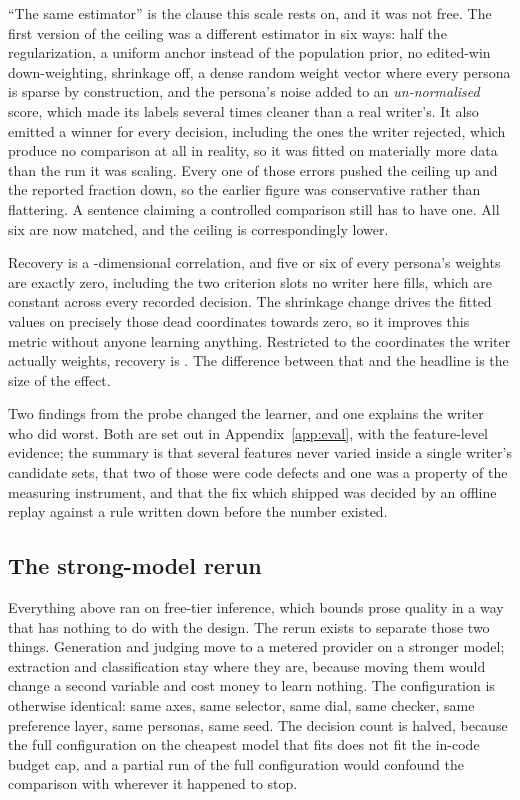 \documentclass{article}
\begin{document}
``The same estimator'' is the clause this scale rests on, and it was not free. The first version of the ceiling was a different estimator in six ways:
half the regularization, a uniform anchor instead of the population prior, no edited-win
down-weighting, shrinkage off, a dense random weight vector where every persona is sparse by
construction, and the persona's noise added to an \emph{un-normalised} score, which made its
labels several times cleaner than a real writer's. It also emitted a winner for every
decision, including the ones the writer rejected, which produce no comparison at all in
reality, so it was fitted on materially more data than the run it was scaling. Every one of
those errors pushed the ceiling up and the reported fraction down, so the earlier figure was
conservative rather than flattering. A sentence claiming a controlled comparison still
has to have one. All six are now matched, and the ceiling is correspondingly lower.

Recovery is a \rFeatures{}-dimensional correlation,
and five or six of every persona's \rFeatures{} weights are exactly zero, including the two
criterion slots no writer here fills, which are constant across every recorded decision. The
shrinkage change drives the fitted values on precisely those dead coordinates towards zero, so
it improves this metric without anyone learning anything. Restricted to the coordinates the
writer actually weights, recovery is \rLiveWeightRecoveryIdentified{}. The difference between that and the headline is the size of the effect.

Two findings from the probe changed the learner, and one explains the writer who did worst. Both are set out in Appendix~\ref{app:eval}, with the
feature-level evidence; the summary is that several features never varied inside a single
writer's candidate sets, that two of those were code defects and one was a property of the
measuring instrument, and that the fix which shipped was decided by an offline replay
against a rule written down before the number existed.

\subsection{The strong-model rerun}
\label{sec:metered}

Everything above ran on free-tier inference, which bounds prose quality in a way that has
nothing to do with the design. The rerun exists to separate those two things. Generation and
judging move to a metered provider on a stronger model; extraction and classification stay
where they are, because moving them would change a second variable and cost money to learn
nothing. The configuration is otherwise identical: same axes, same selector, same dial, same
checker, same preference layer, same personas, same seed. The decision count is halved,
because the full configuration on the cheapest model that fits does not fit the in-code
budget cap, and a partial run of the full configuration would confound the comparison with
wherever it happened to stop.
\end{document}
